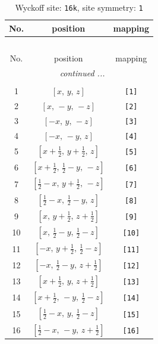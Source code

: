 \documentclass[fleqn,8pt]{jsarticle}
\begin{document}
\begin{longtable}{ccc}
\caption{Wyckoff site: {\tt 16k}, site symmetry: {\tt 1}}
 \\
 \hline \hline
No. & position & mapping \\ \hline \endfirsthead

\multicolumn{2}{l}{\tablename\ \thetable{}} \\
 \hline \hline
No. & position & mapping \\ \hline \endhead

 \hline \hline
\multicolumn{2}{r}{\footnotesize\it continued ...} \\ \endfoot

 \hline \hline
\multicolumn{2}{r}{} \\ \endlastfoot

1 & $\left[ x,\, y,\, z \right]$ & {\tt [1]} \\ \hline
2 & $\left[ x,\, - y,\, - z \right]$ & {\tt [2]} \\ \hline
3 & $\left[ - x,\, y,\, - z \right]$ & {\tt [3]} \\ \hline
4 & $\left[ - x,\, - y,\, z \right]$ & {\tt [4]} \\ \hline
5 & $\left[ x + \frac{1}{2},\, y + \frac{1}{2},\, z \right]$ & {\tt [5]} \\ \hline
6 & $\left[ x + \frac{1}{2},\, \frac{1}{2} - y,\, - z \right]$ & {\tt [6]} \\ \hline
7 & $\left[ \frac{1}{2} - x,\, y + \frac{1}{2},\, - z \right]$ & {\tt [7]} \\ \hline
8 & $\left[ \frac{1}{2} - x,\, \frac{1}{2} - y,\, z \right]$ & {\tt [8]} \\ \hline
9 & $\left[ x,\, y + \frac{1}{2},\, z + \frac{1}{2} \right]$ & {\tt [9]} \\ \hline
10 & $\left[ x,\, \frac{1}{2} - y,\, \frac{1}{2} - z \right]$ & {\tt [10]} \\ \hline
11 & $\left[ - x,\, y + \frac{1}{2},\, \frac{1}{2} - z \right]$ & {\tt [11]} \\ \hline
12 & $\left[ - x,\, \frac{1}{2} - y,\, z + \frac{1}{2} \right]$ & {\tt [12]} \\ \hline
13 & $\left[ x + \frac{1}{2},\, y,\, z + \frac{1}{2} \right]$ & {\tt [13]} \\ \hline
14 & $\left[ x + \frac{1}{2},\, - y,\, \frac{1}{2} - z \right]$ & {\tt [14]} \\ \hline
15 & $\left[ \frac{1}{2} - x,\, y,\, \frac{1}{2} - z \right]$ & {\tt [15]} \\ \hline
16 & $\left[ \frac{1}{2} - x,\, - y,\, z + \frac{1}{2} \right]$ & {\tt [16]} \\
\end{longtable}
\end{document}
